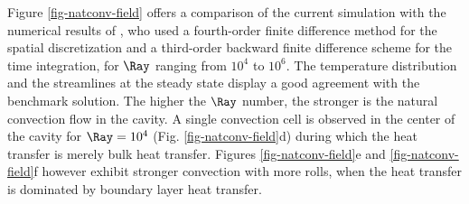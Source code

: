 Figure \ref{fig-natconv-field} offers a comparison of the current simulation with the numerical results of \cite{Wakashima-2004}, who
used a fourth-order finite difference method for the spatial discretization and a third-order backward finite difference scheme for the time integration, for $\Ray$ ranging from $10^4$ to $10^6$.
The temperature distribution and the streamlines at the steady state display a good agreement with the benchmark solution.
The higher the $\Ray$ number, the stronger is the natural convection flow in the cavity.
A single convection cell is observed in the center of the cavity for $\Ray = 10^4$ (Fig. \ref{fig-natconv-field}d) during which the heat transfer is merely bulk heat transfer.
Figures \ref{fig-natconv-field}e and \ref{fig-natconv-field}f however exhibit stronger convection with more rolls, when the heat transfer is dominated by boundary layer heat transfer.


